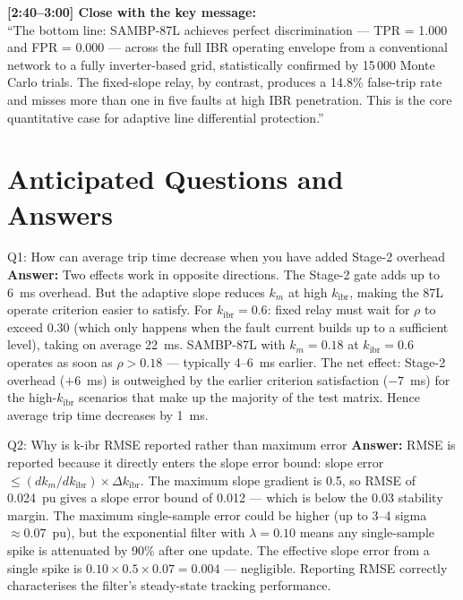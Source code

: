 \documentclass[12pt,a4paper]{article}
\newcommand{\kibr}{k_\mathrm{ibr}}
\begin{document}
\begin{speakbox}
\textbf{[2:40--3:00] Close with the key message:}\\
``The bottom line: SAMBP-87L achieves perfect discrimination --- TPR = 1.000 and FPR = 0.000 --- across the full IBR operating envelope from a conventional network to a fully inverter-based grid, statistically confirmed by 15\,000 Monte Carlo trials. The fixed-slope relay, by contrast, produces a 14.8\% false-trip rate and misses more than one in five faults at high IBR penetration. This is the core quantitative case for adaptive line differential protection.''
\end{speakbox}

\section{Anticipated Questions and Answers}

\begin{keybox}{Q1: How can average trip time decrease when you have added Stage-2 overhead}
\textbf{Answer:} Two effects work in opposite directions. The Stage-2 gate adds up to 6~ms overhead. But the adaptive slope reduces $k_m$ at high $\kibr$, making the 87L operate criterion easier to satisfy. For $\kibr = 0.6$: fixed relay must wait for $\rho$ to exceed 0.30 (which only happens when the fault current builds up to a sufficient level), taking on average 22~ms. SAMBP-87L with $k_m = 0.18$ at $\kibr = 0.6$ operates as soon as $\rho > 0.18$ --- typically 4--6~ms earlier. The net effect: Stage-2 overhead ($+6$~ms) is outweighed by the earlier criterion satisfaction ($-7$~ms) for the high-$\kibr$ scenarios that make up the majority of the test matrix. Hence average trip time decreases by 1~ms.
\end{keybox}

\begin{keybox}{Q2: Why is k-ibr RMSE reported rather than maximum error}
\textbf{Answer:} RMSE is reported because it directly enters the slope error bound: slope error $\leq (dk_m/d\kibr) \times \Delta\kibr$. The maximum slope gradient is 0.5, so RMSE of 0.024~pu gives a slope error bound of 0.012 --- which is below the 0.03 stability margin. The maximum single-sample error could be higher (up to 3--4 sigma $\approx 0.07$~pu), but the exponential filter with $\lambda = 0.10$ means any single-sample spike is attenuated by 90\% after one update. The effective slope error from a single spike is $0.10 \times 0.5 \times 0.07 = 0.004$ --- negligible. Reporting RMSE correctly characterises the filter's steady-state tracking performance.
\end{keybox}
\end{document}
